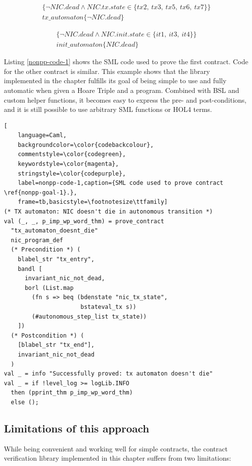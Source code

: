 \documentclass{kththesis}
\begin{document}
{\begin{multline}
	\{\neg NIC.dead \land NIC.tx.state \in \{tx2,~tx3,~tx5,~tx6,~tx7\}\}\\
	tx\_automaton\{\neg NIC.dead\}
    \label{nonpp-goal-1}
\end{multline}

\begin{multline}
	\{\neg NIC.dead \land NIC.init.state \in \{it1,~it3,~it4\}\}\\
	init\_automaton\{NIC.dead\}
    \label{nonpp-goal-2}
\end{multline}

Listing \ref{nonpp-code-1} shows the SML code used to prove the first contract. Code for the other contract is similar. This example shows that the library implemented in the chapter fulfills its goal of being simple to use and fully automatic when given a Hoare Triple and a program. Combined with BSL and custom helper functions, it becomes easy to express the pre- and post-conditions, and it is still possible to use arbitrary SML functions or HOL4 terms.

\begin{lstlisting}[
    language=Caml,
    backgroundcolor=\color{codebackcolour},
    commentstyle=\color{codegreen},
    keywordstyle=\color{magenta},
    stringstyle=\color{codepurple},
    label=nonpp-code-1,caption={SML code used to prove contract \ref{nonpp-goal-1}.},
    frame=tb,basicstyle=\footnotesize\ttfamily]
(* TX automaton: NIC doesn't die in autonomous transition *)
val (_, _, p_imp_wp_word_thm) = prove_contract
  "tx_automaton_doesnt_die"
  nic_program_def
  (* Precondition *) (
    blabel_str "tx_entry",
    bandl [
      invariant_nic_not_dead,
      borl (List.map
        (fn s => beq (bdenstate "nic_tx_state",
                      bstateval_tx s))
        (#autonomous_step_list tx_state))
    ])
  (* Postcondition *) (
    [blabel_str "tx_end"],
    invariant_nic_not_dead
  )
val _ = info "Successfully proved: tx automaton doesn't die"
val _ = if !level_log >= logLib.INFO
  then (pprint_thm p_imp_wp_word_thm)
  else ();
\end{lstlisting}

\subsection{Limitations of this approach}

While being convenient and working well for simple contracts, the contract verification library implemented in this chapter suffers from two limitations:

}
\end{document}
